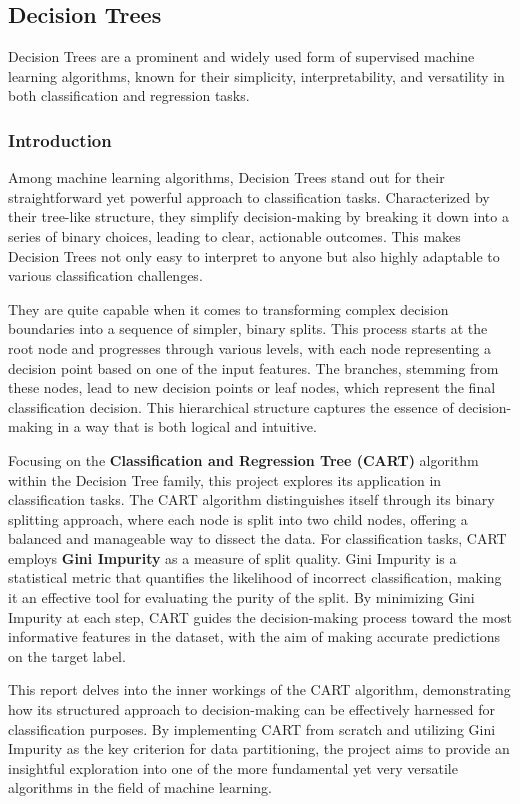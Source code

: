\documentclass[letterpaper,10pt]{article}
\begin{document}
\newpage
\subsection{Decision Trees}
Decision Trees are a prominent and widely used form of supervised machine learning algorithms, known for their simplicity, interpretability, and versatility in both classification and regression tasks. 
\subsubsection{Introduction}
Among machine learning algorithms, Decision Trees stand out for their straightforward yet powerful approach to classification tasks. Characterized by their tree-like structure, they simplify decision-making by breaking it down into a series of binary choices, leading to clear, actionable outcomes. This makes Decision Trees not only easy to interpret to anyone but also highly adaptable to various classification challenges. \par

They are quite capable when it comes to transforming complex decision boundaries into a sequence of simpler, binary splits. This process starts at the root node and progresses through various levels, with each node representing a decision point based on one of the input features. The branches, stemming from these nodes, lead to new decision points or leaf nodes, which represent the final classification decision. This hierarchical structure captures the essence of decision-making in a way that is both logical and intuitive. \par


Focusing on the \textbf{Classification and Regression Tree (CART)} algorithm within the Decision Tree family, this project explores its application in classification tasks. The CART algorithm distinguishes itself through its binary splitting approach, where each node is split into two child nodes, offering a balanced and manageable way to dissect the data. For classification tasks, CART employs \textbf{Gini Impurity} as a measure of split quality. Gini Impurity is a statistical metric that quantifies the likelihood of incorrect classification, making it an effective tool for evaluating the purity of the split. By minimizing Gini Impurity at each step, CART guides the decision-making process toward the most informative features in the dataset, with the aim of making accurate predictions on the target label. \par
This report delves into the inner workings of the CART algorithm, demonstrating how its structured approach to decision-making can be effectively harnessed for classification purposes. By implementing CART from scratch and utilizing Gini Impurity as the key criterion for data partitioning, the project aims to provide an insightful exploration into one of the more fundamental yet very versatile algorithms in the field of machine learning. \par
\end{document}

